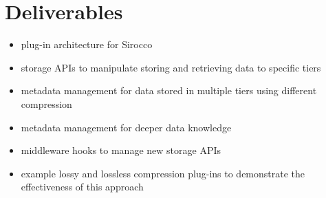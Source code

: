 \section*{Deliverables}

\begin{itemize}
\item plug-in architecture for Sirocco
\item storage APIs to manipulate storing and retrieving data to specific tiers
\item metadata management for data stored in multiple tiers using different compression
\item metadata management for deeper data knowledge
\item middleware hooks to manage new storage APIs
\item example lossy and lossless compression plug-ins to demonstrate the effectiveness of this approach
\end{itemize}

